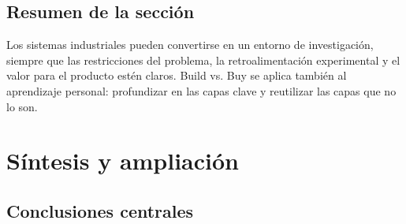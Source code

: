 \documentclass[a4paper]{article}
\begin{document}

\subsection{Resumen de la sección}

Los sistemas industriales pueden convertirse en un entorno de investigación, siempre que las restricciones del problema, la retroalimentación experimental y el valor para el producto estén claros. Build vs. Buy se aplica también al aprendizaje personal: profundizar en las capas clave y reutilizar las capas que no lo son.
\section{Síntesis y ampliación}

\subsection{Conclusiones centrales}
\end{document}
